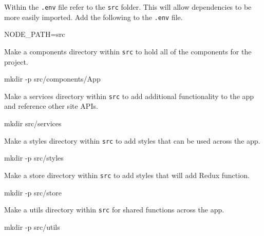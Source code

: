 \documentclass[]{book}
\newenvironment{Shaded}{\begin{snugshade}}{\end{snugshade}}
\newcommand{\FunctionTok}[1]{\textcolor[rgb]{0.00,0.00,0.00}{#1}}
\newcommand{\VariableTok}[1]{\textcolor[rgb]{0.00,0.00,0.00}{#1}}
\newcommand{\NormalTok}[1]{#1}
\begin{document}
Within the \texttt{.env} file refer to the \texttt{src} folder. This
will allow dependencies to be more easily imported. Add the following to
the \texttt{.env} file.

\begin{Shaded}
\begin{Highlighting}[]
\VariableTok{NODE_PATH=}\NormalTok{src}
\end{Highlighting}
\end{Shaded}

Make a components directory within \texttt{src} to hold all of the
components for the project.

\begin{Shaded}
\begin{Highlighting}[]
\FunctionTok{mkdir}\NormalTok{ -p src/components/App}
\end{Highlighting}
\end{Shaded}

Make a services directory within \texttt{src} to add additional
functionality to the app and reference other site APIs.

\begin{Shaded}
\begin{Highlighting}[]
\FunctionTok{mkdir}\NormalTok{ src/services}
\end{Highlighting}
\end{Shaded}

Make a styles directory within \texttt{src} to add styles that can be
used across the app.

\begin{Shaded}
\begin{Highlighting}[]
\FunctionTok{mkdir}\NormalTok{ -p src/styles}
\end{Highlighting}
\end{Shaded}

Make a store directory within \texttt{src} to add styles that will add
Redux function.

\begin{Shaded}
\begin{Highlighting}[]
\FunctionTok{mkdir}\NormalTok{ -p src/store}
\end{Highlighting}
\end{Shaded}

Make a utils directory within \texttt{src} for shared functions across
the app.

\begin{Shaded}
\begin{Highlighting}[]
\FunctionTok{mkdir}\NormalTok{ -p src/utils}
\end{Highlighting}
\end{Shaded}
\end{document}
